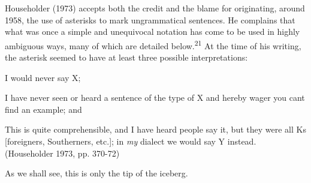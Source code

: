 \begin{styleTextbody}
Householder (1973) accepts both the credit and the blame for originating, around 1958, the use of asterisks to mark ungrammatical sentences. He complains that what was once a simple and unequivocal notation has come to be used in highly ambiguous ways, many of which are detailed below.\textsuperscript{21}\textsuperscript{ }At the time of his writing, the asterisk seemed to have at least three possible interpretations:
\end{styleTextbody}


\begin{listWWNumlviiileveli}
\item 
\setcounter{listWWNumlviiilevelii}{2}
\begin{listWWNumlviiilevelii}
\item 
\setcounter{listWWNumlviiileveliii}{3}
\begin{listWWNumlviiileveliii}
\item 
\setcounter{listWWNumlviiileveliv}{0}
\begin{listWWNumlviiileveliv}
\item 
\begin{styleTextbody}
{\textquotedbl}I would never say X{\textquotedbl};
\end{styleTextbody}


\item 
\begin{styleTextbody}
{\textquotedbl}I have never seen or heard a sentence of the type of X and hereby wager you can{\textquotesingle}t find an example{\textquotedbl}; and
\end{styleTextbody}


\item 
\begin{styleTextbody}
{\textquotedbl}This is quite comprehensible, and I have heard people say it, but they were all K{\textquotesingle}s [foreigners, Southerners, etc.]; in \textit{my}\textit{ }dialect we would say Y instead.{\textquotedbl} (Householder 1973, pp. 370-72)
\end{styleTextbody}


\end{listWWNumlviiileveliv}
\end{listWWNumlviiileveliii}
\end{listWWNumlviiilevelii}
\end{listWWNumlviiileveli}
\begin{styleTextbody}
As we shall see, this is only the tip of the iceberg.
\end{styleTextbody}


